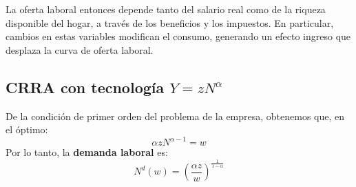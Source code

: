 \documentclass[11pt]{article}
\begin{document}
La oferta laboral entonces depende tanto del salario real como de la riqueza disponible del hogar, a través de los beneficios y los impuestos. En particular, cambios en estas variables modifican el consumo, generando un efecto ingreso que desplaza la curva de oferta laboral.

\subsection{CRRA con tecnología $Y = zN^\alpha$}

De la condición de primer orden del problema de la empresa, obtenemos que, en el óptimo:
$$
\alpha z N^{\alpha-1} = w
$$
Por lo tanto, la \textbf{demanda laboral} es:
$$
N^{d}(w) = \left( \frac{\alpha z}{w}\right)^{\tfrac{1}{1-\alpha}}
$$
 
\end{document}
